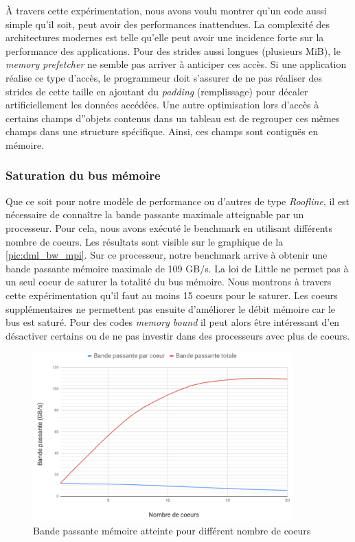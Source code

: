         À travers cette expérimentation, nous avons voulu montrer qu'un code aussi simple qu'il soit, peut avoir des performances inattendues. La complexité des architectures modernes est telle qu'elle peut avoir une incidence forte sur la performance des applications. Pour des strides aussi longues (plusieurs MiB), le \textit{memory prefetcher} ne semble pas arriver à anticiper ces accès. Si une application réalise ce type d'accès, le programmeur doit s'assurer de ne pas réaliser des strides de cette taille en ajoutant du \textit{padding} (remplissage) pour décaler artificiellement les données accédées. Une autre optimisation lors d'accès à certains champs d''objets contenus dans un tableau est de regrouper ces mêmes champs dans une structure spécifique. Ainsi, ces champs sont contiguës en mémoire. 
        
        
        

    \subsubsection{Saturation du bus mémoire}
        Que ce soit pour notre modèle de performance ou d'autres de type \textit{Roofline}, il est nécessaire de connaître la bande passante maximale atteignable par un processeur. Pour cela, nous avons exécuté le benchmark en utilisant différents nombre de coeurs. Les résultats sont visible sur le graphique de la \autoref{pic:dml_bw_mpi}. Sur ce processeur, notre benchmark arrive à obtenir une bande passante mémoire maximale de 109 GB/s. La loi de Little ne permet pas à un seul coeur de saturer la totalité du bus mémoire. Nous montrons à travers cette expérimentation qu'il faut au moins 15 coeurs pour le saturer. Les coeurs supplémentaires ne permettent pas ensuite d'améliorer le débit mémoire car le bus est saturé. Pour des codes \textit{memory bound} il peut alors être intéressant d'en désactiver certains ou de ne pas investir dans des processeurs avec plus de coeurs. 
        
        \begin{figure}
        \center
        \includegraphics[width=10cm]{images/dml_bw_mpi.png}
        \caption{\label{pic:dml_bw_mpi} Bande passante mémoire atteinte pour différent nombre de coeurs  }
        \end{figure}
        
